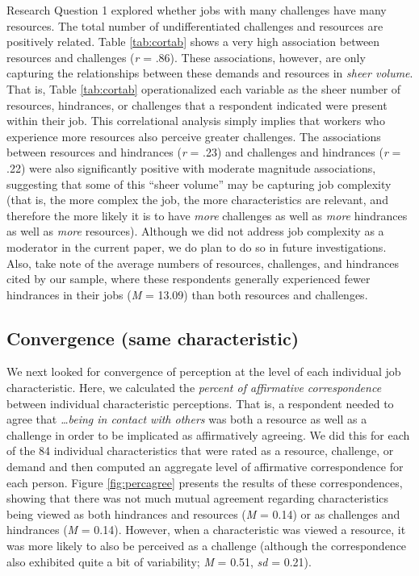 \documentclass[
  man]{apa6}
\begin{document}
Research Question 1 explored whether jobs with many challenges have many resources. The total number of undifferentiated challenges and resources are positively related. Table \ref{tab:cortab} shows a very high association between resources and challenges (\emph{r} = .86). These associations, however, are only capturing the relationships between these demands and resources in \emph{sheer volume}. That is, Table \ref{tab:cortab} operationalized each variable as the sheer number of resources, hindrances, or challenges that a respondent indicated were present within their job. This correlational analysis simply implies that workers who experience more resources also perceive greater challenges. The associations between resources and hindrances (\emph{r} = .23) and challenges and hindrances (\emph{r} = .22) were also significantly positive with moderate magnitude associations, suggesting that some of this ``sheer volume'' may be capturing job complexity (that is, the more complex the job, the more characteristics are relevant, and therefore the more likely it is to have \emph{more} challenges as well as \emph{more} hindrances as well as \emph{more} resources). Although we did not address job complexity as a moderator in the current paper, we do plan to do so in future investigations. Also, take note of the average numbers of resources, challenges, and hindrances cited by our sample, where these respondents generally experienced fewer hindrances in their jobs (\emph{M} = 13.09) than both resources and challenges.

\hypertarget{convergence-same-characteristic}{%
\subsection{Convergence (same characteristic)}\label{convergence-same-characteristic}}

We next looked for convergence of perception at the level of each individual job characteristic. Here, we calculated the \emph{percent of affirmative correspondence} between individual characteristic perceptions. That is, a respondent needed to agree that \emph{\ldots being in contact with others} was both a resource as well as a challenge in order to be implicated as affirmatively agreeing. We did this for each of the 84 individual characteristics that were rated as a resource, challenge, or demand and then computed an aggregate level of affirmative correspondence for each person. Figure \ref{fig:percagree} presents the results of these correspondences, showing that there was not much mutual agreement regarding characteristics being viewed as both hindrances and resources (\emph{M} = 0.14) or as challenges and hindrances (\emph{M} = 0.14). However, when a characteristic was viewed a resource, it was more likely to also be perceived as a challenge (although the correspondence also exhibited quite a bit of variability; \emph{M} = 0.51, \emph{sd} = 0.21).
\end{document}
